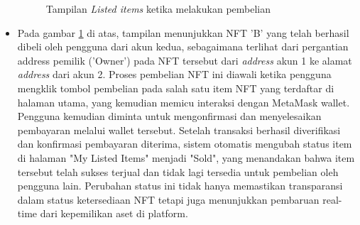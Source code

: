 \begin{itemize}
      \begin{figure} [H] \centering
        \caption{Tampilan \emph{Listed items} ketika melakukan pembelian}
        \label{fig:new_listed_item}
        \end{figure}

      \item Pada gambar \ref{fig:new_listed_item} di atas, tampilan menunjukkan NFT 'B' yang telah berhasil dibeli oleh pengguna dari akun kedua, sebagaimana terlihat dari pergantian address pemilik ('Owner') pada NFT tersebut dari \emph{address} akun 1 ke alamat \emph{address} dari akun 2. Proses pembelian NFT ini diawali ketika pengguna mengklik tombol pembelian pada salah satu item NFT yang terdaftar di halaman utama, yang kemudian memicu interaksi dengan MetaMask wallet. Pengguna kemudian diminta untuk mengonfirmasi dan menyelesaikan pembayaran melalui wallet tersebut. Setelah transaksi berhasil diverifikasi dan konfirmasi pembayaran diterima, sistem otomatis mengubah status item di halaman "My Listed Items" menjadi "Sold", yang menandakan bahwa item tersebut telah sukses terjual dan tidak lagi tersedia untuk pembelian oleh pengguna lain. Perubahan status ini tidak hanya memastikan transparansi dalam status ketersediaan NFT tetapi juga menunjukkan pembaruan real-time dari kepemilikan aset di platform.
      

\end{itemize}
